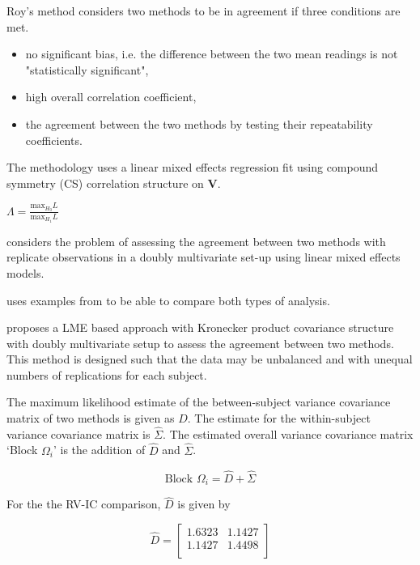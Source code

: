 \documentclass[12pt, a4paper]{report}
\theoremstyle{plain}
\theoremstyle{definition}
\theoremstyle{remark}
\begin{document}
Roy's method considers two methods to be in agreement if three
conditions are met.

\begin{itemize}
	\item no significant bias, i.e. the difference between the two
	mean readings is not "statistically significant",
	
	\item high overall correlation coefficient,
	
	\item the agreement between the two methods by testing their
	repeatability coefficients.
	
\end{itemize}

The methodology uses a linear mixed effects regression fit using
compound symmetry (CS) correlation structure on \textbf{V}.


$\Lambda = \frac{\mbox{max}_{H_{0}}L}{\mbox{max}_{H_{1}}L}$



\citet{ARoy2009} considers the problem of assessing the agreement
between two methods with replicate observations in a doubly
multivariate set-up using linear mixed effects models.

\citet{ARoy2009} uses examples from \citet{BA86} to be able to
compare both types of analysis.

\citet{ARoy2009} proposes a LME based approach with Kronecker
product covariance structure with doubly multivariate setup to
assess the agreement between two methods. This method is designed
such that the data may be unbalanced and with unequal numbers of
replications for each subject.

The maximum likelihood estimate of the between-subject variance
covariance matrix of two methods is given as $D$. The estimate for
the within-subject variance covariance matrix is $\hat{\Sigma}$.
The estimated overall variance covariance matrix `Block
$\Omega_{i}$' is the addition of $\hat{D}$ and $\hat{\Sigma}$.


\begin{equation}
\mbox{Block  }\Omega_{i} = \hat{D} + \hat{\Sigma}
\end{equation}

For the the RV-IC comparison, $\hat{D}$ is given by


\begin{equation}
\hat{D}= \left[ \begin{array}{cc}
1.6323 & 1.1427  \\
1.1427 & 1.4498 \\
\end{array} \right]
\end{equation}
\end{document}
